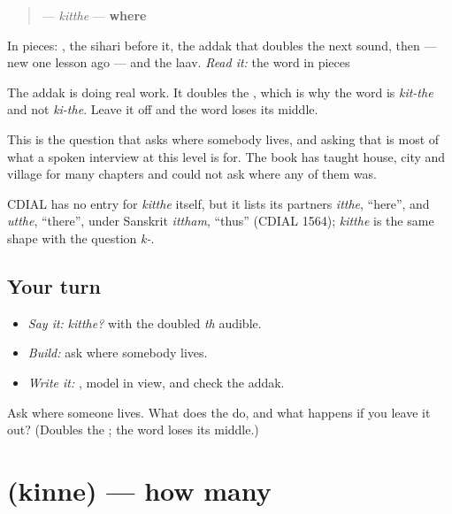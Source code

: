 \begin{cousinweb}
\begin{quote}
\textbf{} — \emph{kitthe} — \textbf{where}
\end{quote}

In pieces: \textbf{}, the \textbf{} sihari before it, the \textbf{} addak that doubles the next sound, then \textbf{} — new one lesson ago — and the \textbf{} laav. \emph{Read it:} the word in pieces

The addak is doing real work. It doubles the \textbf{}, which is why the word is \emph{kit-the} and not \emph{ki-the}. Leave it off and the word loses its middle.

This is the question that asks where somebody lives, and asking that is most of what a spoken interview at this level is for. The book has taught house, city and village for many chapters and could not ask where any of them was.

CDIAL has no entry for \emph{kitthe} itself, but it lists its partners \emph{itthe}, \textquotedblleft{}here\textquotedblright{}, and \emph{utthe}, \textquotedblleft{}there\textquotedblright{}, under Sanskrit \emph{ittham}, \textquotedblleft{}thus\textquotedblright{} (CDIAL 1564); \emph{kitthe} is the same shape with the question \emph{k-}.
\end{cousinweb}

\subsection*{Your turn}
\begin{itemize}
\raggedright
  \item \emph{Say it:} \emph{kitthe?} with the doubled \emph{th} audible.
  \item \emph{Build:} ask where somebody lives.
  \item \emph{Write it:} \textbf{}, model in view, and check the addak.
\end{itemize}

\begin{tcolorbox}[breakable,colback=teal!4,colframe=teal!35!black,title={Before you move on}]
Ask where someone lives. What does the \textbf{} do, and what happens if you leave it out? (Doubles the \textbf{}; the word loses its middle.)
\end{tcolorbox}
\section[\texorpdfstring{\pa{ਕਿੰਨੇ} (kinne)}{ਕਿੰਨੇ (kinne)}]{ (kinne) — how many}

